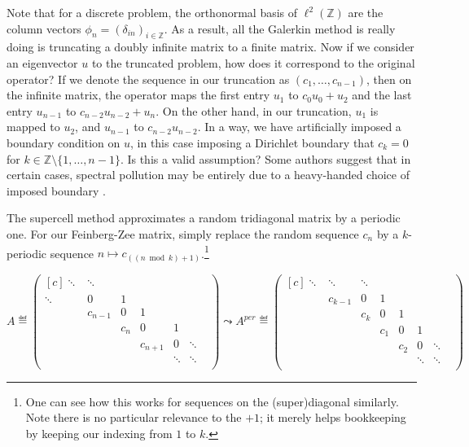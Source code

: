 \documentclass[../main.tex]{subfiles}
\begin{document}
Note that for a discrete problem, the orthonormal basis of $\ell^2(\mathbb{Z})$
are the column vectors $\phi_n = (\delta_{in})_{i \in \mathbb{Z}}$. As a result,
all the Galerkin method is really doing is truncating a doubly infinite matrix
to a finite matrix. Now if we consider an eigenvector $u$ to the truncated
problem, how does it correspond to the original operator? If we denote the
sequence in our truncation as $(c_1, \hdots, c_{n-1})$, then on the infinite
matrix, the operator maps the first entry $u_1$ to $c_0 u_0 + u_2$ and the last
entry $u_{n-1}$ to $c_{n-2} u_{n-2} + u_{n}$. On the other hand, in our
truncation, $u_1$ is mapped to $u_2$, and $u_{n-1}$ to $c_{n-2} u_{n-2}$. In a
way, we have artificially imposed a boundary condition on $u$, in this case
imposing a Dirichlet boundary that $c_k = 0$ for $k \in \mathbb{Z} \setminus
\{1, \hdots, n-1\}$. Is this a valid assumption? Some authors suggest that in
certain cases, spectral pollution may be entirely due to a heavy-handed choice
of imposed boundary \cite{cances2011periodic}.

The supercell method approximates a random tridiagonal matrix by a periodic one.
For our Feinberg-Zee matrix, simply replace the random sequence $c_n$ by a
$k$-periodic sequence $n \mapsto c_{((n \bmod k )+ 1)}$.\footnote{One can see
how this works for sequences on the (super)diagonal similarly. Note there is no
particular relevance to the $+1$; it merely helps bookkeeping by keeping our
indexing from $1$ to $k$.}

  $$ 
  A \eqdef
  \begin{pmatrix*}[c]
    \ddots & \ddots & & & & \\
    \ddots & 0 & 1 & & & \\
    & c_{n-1} & 0 & 1 & & \\
    & & c_{n} & 0 & 1 & \\
    & & & c_{n+1} & 0 & \ddots \\
    & & & & \ddots & \ddots & \\
  \end{pmatrix*}
  \leadsto 
  A^{per} \eqdef
  \begin{pmatrix*}[c]
    \ddots & \ddots & \ddots & & & &\\
    & c_{k-1} & 0 & 1 & & & &\\
    & & c_{k} & 0 & 1 & & &\\
    & & & c_1 & 0 & 1 & \\
    & & &  & c_2 & 0 & \ddots \\
    & & & & & \ddots & \ddots & \\ \end{pmatrix*} $$
\end{document}

